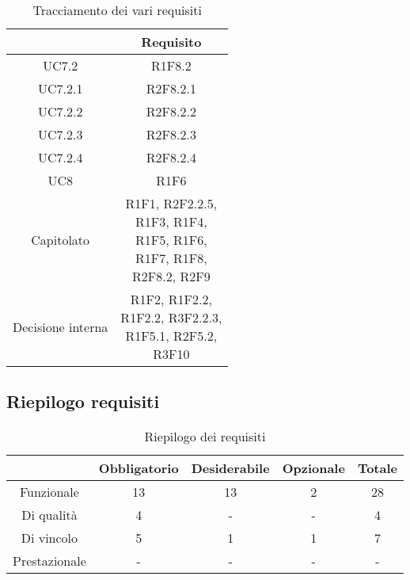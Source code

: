 \begin{table}[H]
	\centering
	\renewcommand{\arraystretch}{1.8}
	\begin{tabular}{c | c}
		\rowcolor[HTML]{125E28}
		\multicolumn{1}{c}{\color[HTML]{FFFFFF} \textbf{Fonte}} &
		\multicolumn{1}{c}{\color[HTML]{FFFFFF} \textbf{Requisito}} \\
		\hline
		UC7.2 & R1F8.2 \\ \hline
		UC7.2.1 & R2F8.2.1 \\ \hline
		UC7.2.2 & R2F8.2.2 \\ \hline
		UC7.2.3 & R2F8.2.3 \\ \hline
		UC7.2.4 & R2F8.2.4 \\ \hline
		UC8 & R1F6 \\ \hline
		Capitolato & \shortstack{R1F1, R2F2.2.5, \\R1F3, R1F4, \\R1F5, R1F6, \\R1F7, R1F8,\\ R2F8.2, R2F9}  \\ \hline
		Decisione interna & \shortstack{R1F2, R1F2.2,\\ R1F2.2, R3F2.2.3,\\ R1F5.1, R2F5.2,\\ R3F10} \\
	\end{tabular}
    \caption{Tracciamento dei vari requisiti}
\end{table}

\subsection{Riepilogo requisiti} \label{subsection: riepilogo}

\begin{table}[H]
    \centering
    \renewcommand{\arraystretch}{1.8}
    \begin{tabular}{c | c | c | c | c}
        \rowcolor[HTML]{125E28}
        \multicolumn{1}{c}{\color[HTML]{FFFFFF} \textbf{Tipologia}}          &
        \multicolumn{1}{c}{\color[HTML]{FFFFFF} \textbf{Obbligatorio}} &
        \multicolumn{1}{c}{\color[HTML]{FFFFFF} \textbf{Desiderabile}}     &
        \multicolumn{1}{c}{\color[HTML]{FFFFFF} \textbf{Opzionale}}     &
        \multicolumn{1}{c}{\color[HTML]{FFFFFF} \textbf{Totale}}                                                                                                                                             \\
        \hline
        Funzionale & 13 & 13 & 2 & 28 \\ \hline
        Di qualità & 4 & - & - & 4 \\ \hline
        Di vincolo & 5 & 1 & 1 & 7 \\ \hline
        Prestazionale & - & - & - & - \\ 
    \end{tabular}
    \caption{Riepilogo dei requisiti}
\end{table}